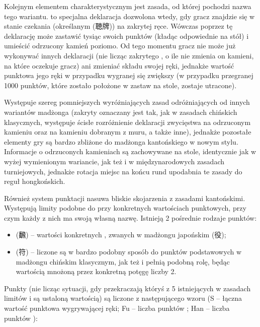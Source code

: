 Kolejnym elementem charakterystycznym  jest zasada, od której
pochodzi nazwa tego wariantu.  to specjalna deklaracja dozwolona
wtedy, gdy gracz znajdzie się w stanie czekania (określanym 
(聴牌)) na zakrytej ręce. Wówczas poprzez tę deklarację może zastawić tysiąc
swoich punktów (kładąc odpowiednie  na stół) i umieścić
odrzucony kamień poziomo. Od tego momentu gracz nie może już wykonywać innych
deklaracji (nie licząc zakrytego , o ile nie zmienia on kamieni,
na które oczekuje gracz) ani zmieniać składu swojej ręki, jednakże wartość
punktowa jego ręki w przypadku wygranej się zwiększy (w przypadku przegranej
1000 punktów, które zostało położone w zastaw na stole, zostaje utracone).

Występuje szereg pomniejszych wyróżniających zasad odróżniających 
od innych wariantów madżonga (zakryty  oznaczany jest tak, jak w
zasadach chińskich klasycznych, występuje ścisłe rozróżnienie deklaracji
zwycięstwa na odrzuconym kamieniu oraz na kamieniu dobranym z muru, a także
inne), jednakże pozostałe elementy gry są bardzo zbliżone do madżonga
kantońskiego w nowym stylu. Informacje o odrzuconych kamieniach są zachowywane
na stole, identycznie jak w wyżej wymienionym wariancie, jak też i w
międzynarodowych zasadach turniejowych, jednakże rotacja miejsc na końcu rund
upodabnia te zasady do reguł hongkońskich.

Również system punktacji nasuwa bliskie skojarzenia z zasadami kantońskimi.
Występują limity podobne do  przy konkretnych wartościach
punktowych, przy czym każdy z nich ma swoją własną nazwę. 
Istnieją 2 pośrednie rodzaje punktów:
\begin{itemize}
  \item {} (飜) -- wartości konkretnych , zwanych w
  madżongu japońskim  (役);
  \item {} (符) -- liczone są w bardzo podobny
sposób do punktów podstawowych w madżongu chińskim klasycznym, jak też i pełnią
podobną rolę, będąc wartością mnożoną przez konkretną potęgę liczby 2.
\end{itemize}
Punkty (nie licząc sytuacji, gdy przekraczają któryś z 5 istniejących w
zasadach limitów i są ustaloną wartością) są liczone z następującego wzoru (S
-- łączna wartość punktowa wygrywającej ręki; Fu -- liczba punktów ;
Han -- liczba punktów ):

